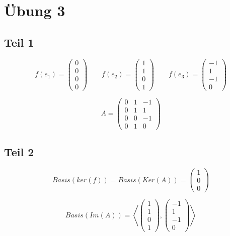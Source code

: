 \documentclass[a4paper,10pt]{article}
\begin{document}
\section*{Übung 3}

\subsection*{Teil 1}

\begin{equation}
 f(e_1) = 
  \begin{pmatrix}
   0\\
   0\\
   0\\
   0
  \end{pmatrix}
 \qquad
 f(e_2) = 
  \begin{pmatrix}
   1\\
   1\\
   0\\
   1
  \end{pmatrix}
 \qquad
 f(e_3) = 
  \begin{pmatrix}
   -1\\
   1\\
   -1\\
   0
  \end{pmatrix}
\end{equation}


\begin{equation}
 A = 
  \begin{pmatrix}
   0 & 1 & -1\\
   0 & 1 & 1\\
   0 & 0 & -1\\
   0 & 1 & 0
  \end{pmatrix}
\end{equation}

\subsection*{Teil 2}

\begin{equation}
 Basis(ker(f)) = Basis(Ker(A)) =
  \begin{pmatrix}
   1\\
   0\\
   0
  \end{pmatrix}
\end{equation}

\begin{equation}
 Basis(Im(A)) =
  \left\langle
   \begin{pmatrix}
    1\\
    1\\
    0\\
    1
   \end{pmatrix},
   \begin{pmatrix}
    -1\\
    1\\
    -1\\
    0
   \end{pmatrix}
  \right\rangle
\end{equation}
\end{document}
